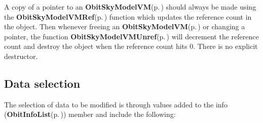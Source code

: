 A copy of a pointer to an {\bf Obit\-Sky\-Model\-VM}{\rm (p.\,\pageref{structObitSkyModelVM})} should always be made using the {\bf Obit\-Sky\-Model\-VMRef}{\rm (p.\,\pageref{ObitSkyModelVM_8h_a1})} function which updates the reference count in the object. Then whenever freeing an {\bf Obit\-Sky\-Model\-VM}{\rm (p.\,\pageref{structObitSkyModelVM})} or changing a pointer, the function {\bf Obit\-Sky\-Model\-VMUnref}{\rm (p.\,\pageref{ObitSkyModelVM_8h_a0})} will decrement the reference count and destroy the object when the reference count hits 0. There is no explicit destructor.\subsection{Data selection}\label{ObitSkyModelVM_8h_ObitSkyModelVMselect}
The selection of data to be modified is through values added to the info ({\bf Obit\-Info\-List}{\rm (p.\,\pageref{structObitInfoList})}) member and include the following: \begin{itemize}

\end{itemize}
